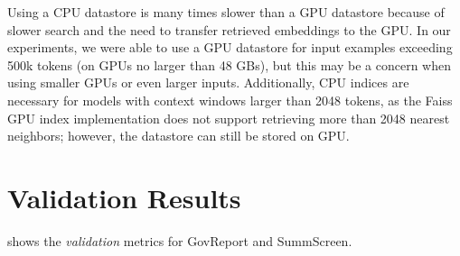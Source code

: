 \documentclass{article}
\begin{document}
Using a CPU datastore is many times slower than a GPU datastore because of slower search and the need to transfer retrieved embeddings to the GPU. 
In our experiments, we were able to use a GPU datastore for input examples exceeding 500k tokens (on GPUs no larger than 48 GBs), but this may be a concern when using smaller GPUs or even larger inputs.
Additionally, CPU indices are necessary for models with context windows larger than 2048 tokens, as the Faiss GPU index implementation does not support retrieving more than 2048 nearest neighbors; however, the datastore can still be stored on GPU.

\section{Validation Results}
\label{appendix:validation}
 shows the \emph{validation} metrics for GovReport and SummScreen.
\end{document}
